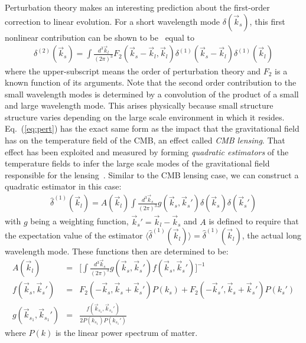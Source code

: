 \documentclass[12pt]{article}
\newcommand{\ec}[1]{Eq.~(\ref{eq:#1})}
\newcommand{\eql}[1]{\label{eq:#1}}
\begin{document}
\begin{small}
Perturbation theory makes an interesting prediction about the first-order correction to linear evolution. For a short wavelength mode $\delta(\vec{k}_s)$, this first nonlinear contribution can be shown to be~\cite{Bernardeau:2001qr} equal to 
\begin{eqnarray}
\delta^{(2)}(\vec{k}_s)=\int\frac{d^{3}\vec{k}_l}{(2 \pi)^3}F_2(\vec{k}_s-\vec{k}_l,\vec{k}_l)\delta^{(1)}(\vec{k}_s-\vec{k}_l)\delta^{(1)}(\vec{k}_l)\eql{pert}
\end{eqnarray}
where the upper-subscript means the order of perturbation theory and $F_2$ is a known function of its arguments. Note that the second order contribution to the small wavelength modes is determined by a convolution of the product of a small and large wavelength mode. 
This arises physically because small structure structure varies depending on the large scale environment in which it resides. \ec{pert} has the exact same form as the impact that the gravitational field has on the temperature field of the CMB, an effect called \emph{CMB lensing}. That effect has been exploited and measured by forming \emph{quadratic estimators} of the temperature fields to infer the large scale modes of the gravitational field responsible for the lensing~\cite{Hu:2001tn}.
Similar to the CMB lensing case, we can construct a quadratic estimator in this case:
\begin{eqnarray}
\hat{\delta}^{(1)}(\vec{k}_l)=A(\vec{k}_l)\int \frac{d^3 \vec{k}_s}{(2\pi)^3} g(\vec{k}_s,\vec{k}_s')\delta(\vec{k}_s)\delta(\vec{k}_s')\eql{quad}
\end{eqnarray}
with $g$ being a weighting function, $\vec{k}_s'=\vec{k}_l-\vec{k}_s$ and $A$ is defined to require that the expectation value of the estimator $\langle \hat{\delta}^{(1)}(\vec{k}_l) \rangle=\hat{\delta}^{(1)}(\vec{k}_l)$, the actual long wavelength mode. These functions then are determined to be:
\begin{eqnarray}
A(\vec{k}_l)&=&\bigg[\int \frac{d^3 \vec{k}_s}{(2\pi)^3} g(\vec{k}_s,\vec{k}_s')f(\vec{k}_s,\vec{k}_s')  \bigg]^{-1} \\
f(\vec{k}_s,\vec{k}_s')&=&F_2(-\vec{k}_s,\vec{k}_s+\vec{k}_s')P(k_s)+F_2(-\vec{k}_s',\vec{k}_s+\vec{k}_s')P(k_s') \\
g(\vec{k}_{s_1},\vec{k}_{s_1}')&=&\frac{f(\vec{k}_{s_1},\vec{k}_{s_1}')}{2P(k_{s_1})P(k_{s_1}')}
\end{eqnarray}
where $P(k)$ is the linear power spectrum of matter.


\end{small}
\end{document}
